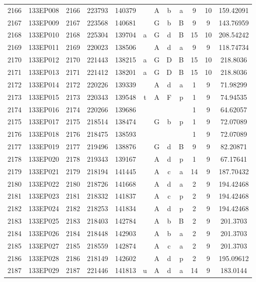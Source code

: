 \begin{tabular}{|*{12}{c|}}
2166 & 133EP008 & 2166 & 223793 & 140379 &  & A & b & a & 9 & 10 & 159.42091 \\ 
2167 & 133EP009 & 2167 & 223568 & 140681 &  & G & b & B & 9 & 9 & 143.76959 \\ 
2168 & 133EP010 & 2168 & 225304 & 139704 & a & G & d & B & 15 & 10 & 208.54242 \\ 
2169 & 133EP011 & 2169 & 220023 & 138506 &  & A & d & a & 9 & 9 & 118.74734 \\ 
2170 & 133EP012 & 2170 & 221443 & 138215 & a & G & D & B & 15 & 10 & 218.8036 \\ 
2171 & 133EP013 & 2171 & 221412 & 138201 & a & G & D & B & 15 & 10 & 218.8036 \\ 
2172 & 133EP014 & 2172 & 220226 & 139339 &  & A & d & a & 1 & 9 & 71.98299 \\ 
2173 & 133EP015 & 2173 & 220343 & 139548 & t & A & F & p & 1 & 9 & 74.94535 \\ 
2174 & 133EP016 & 2174 & 220266 & 139686 &  &  &  &  & 1 & 9 & 64.62057 \\ 
2175 & 133EP017 & 2175 & 218514 & 138474 &  & G & b & p & 1 & 9 & 72.07089 \\ 
2176 & 133EP018 & 2176 & 218475 & 138593 &  &  &  &  & 1 & 9 & 72.07089 \\ 
2177 & 133EP019 & 2177 & 219496 & 138876 &  & G & d & B & 9 & 9 & 82.20871 \\ 
2178 & 133EP020 & 2178 & 219343 & 139167 &  & A & d & p & 1 & 9 & 67.17641 \\ 
2179 & 133EP021 & 2179 & 218194 & 141445 &  & A & c & a & 14 & 9 & 187.70432 \\ 
2180 & 133EP022 & 2180 & 218726 & 141668 &  & A & d & a & 2 & 9 & 194.42468 \\ 
2181 & 133EP023 & 2181 & 218332 & 141837 &  & A & c & p & 2 & 9 & 194.42468 \\ 
2182 & 133EP024 & 2182 & 218253 & 141834 &  & A & d & p & 2 & 9 & 194.42468 \\ 
2183 & 133EP025 & 2183 & 218403 & 142784 &  & A & b & B & 2 & 9 & 201.3703 \\ 
2184 & 133EP026 & 2184 & 218448 & 142903 &  & A & b & a & 2 & 9 & 201.3703 \\ 
2185 & 133EP027 & 2185 & 218559 & 142874 &  & A & c & a & 2 & 9 & 201.3703 \\ 
2186 & 133EP028 & 2186 & 218149 & 142602 &  & A & d & p & 2 & 9 & 195.09612 \\ 
2187 & 133EP029 & 2187 & 221446 & 141813 & u & A & d & a & 14 & 9 & 183.0144 \\ 

\end{tabular}
